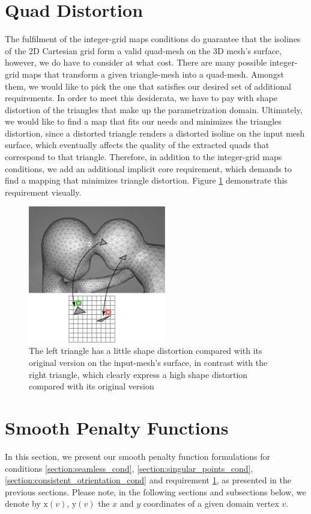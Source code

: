 \section{Quad Distortion}
\label{section:quad_distortion_cond}
The fulfilment of the integer-grid maps conditions do guarantee that the isolines of the 2D Cartesian grid form a valid quad-mesh on the 3D mesh's surface, however, we do have to consider at what cost. There are many possible integer-grid maps that transform a given triangle-mesh into a quad-mesh. Amongst them, we would like to pick the one that satisfies our desired set of additional requirements. In order to meet this desiderata, we have to pay with shape distortion of the triangles that make up the parametrization domain. Ultimately, we would like to find a map that fits our needs and minimizes the triangles distortion, since a distorted triangle renders a distorted isoline on the input mesh surface, which eventually affects the quality of the extracted quads that correspond to that triangle. Therefore, in addition to the integer-grid maps conditions, we add an additional implicit core requirement, which demands to find a mapping that minimizes triangle distortion. Figure \ref{fig:distortion_req} demonstrate this requirement visually.
\begin{figure}[ht]
\centering
\includegraphics[width=6cm]{figures/distortion/distortion.png}
\caption[The Orientation Requirement]{The left triangle has a little shape distortion compared with its original version on the input-mesh's surface, in contrast with the right triangle, which clearly express a high shape distortion compared with its original version}
\label{fig:distortion_req}
\end{figure}
\section{Smooth Penalty Functions}
\label{section:smooth_objective_functions}
In this section, we present our smooth penalty function formulations for conditions \ref{section:seamless_cond}, \ref{section:singular_points_cond}, \ref{section:consistent_otrientation_cond} and requirement \ref{section:quad_distortion_cond}, as presented in the previous sections. Please note, in the following sections and subsections below, we denote by $\mathrm{x}\left(v\right)$, $\mathrm{y}\left(v\right)$ the $x$ and $y$ coordinates of a given domain vertex $v$.
